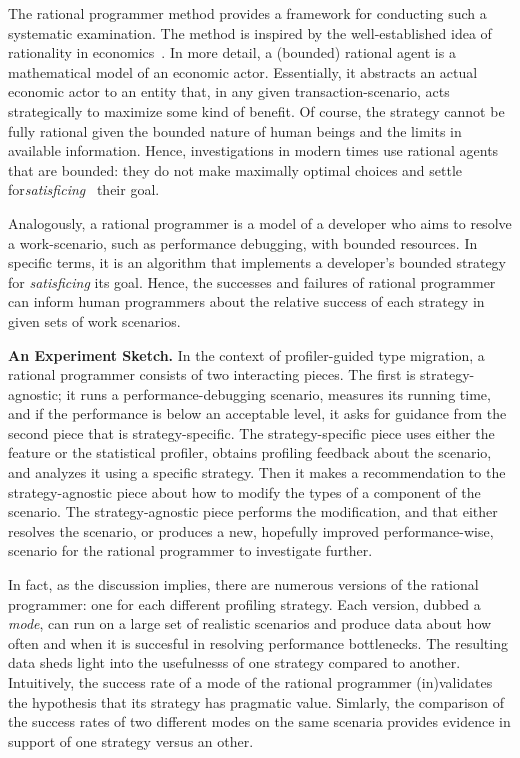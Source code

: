 The rational programmer method provides a framework for conducting such a
systematic examination. The method is inspired by the well-established idea of
rationality in economics~\cite{mill1874essays, henrich2001search}.  In more
detail, a (bounded) rational agent is a mathematical model of an economic
actor. Essentially, it abstracts an actual economic actor to an entity that, in
any given transaction-scenario, acts strategically to maximize some kind of
benefit.  Of course, the strategy cannot be fully rational given the bounded
nature of human beings and the limits in available information. Hence,
investigations in modern times use rational agents that are bounded: they do not
make maximally optimal choices and settle
for\emph{satisficing}~\cite{hs:satisfice} their goal.

Analogously, a rational programmer is a model of a developer who aims to resolve
a work-scenario, such as performance debugging, with bounded resources. In
specific terms, it is an algorithm that implements a developer's bounded
strategy for \emph{satisficing} its goal.  Hence, the successes and failures of
rational programmer can inform human programmers about the relative success of
each strategy in given sets of work scenarios.




\bigskip

\noindent\textbf{An Experiment Sketch.} In the context of profiler-guided
type migration, a rational programmer consists of two interacting pieces.
The first is strategy-agnostic; it runs a performance-debugging scenario,
measures its running time, and if the performance is below an acceptable
level, it asks for guidance from the second piece that is
strategy-specific. The strategy-specific piece uses either the feature or
the statistical profiler, obtains profiling feedback about the scenario,
and analyzes it using a specific strategy. Then it makes a recommendation
to the strategy-agnostic piece about how to modify the types of a
component of the scenario. The strategy-agnostic piece performs the
modification, and that either resolves the scenario, or produces a new,
hopefully improved performance-wise, scenario for the rational programmer
to investigate further. 

In fact, as the discussion implies, 
there are numerous versions of  the rational programmer: 
one for each different profiling strategy. Each version, dubbed a
\emph{mode}, can run on a large set of realistic scenarios and produce
data about how often and when it is succesful in resolving performance
bottlenecks. The resulting data sheds light into the usefulnesss
of one strategy compared to another. Intuitively, the success rate of a mode of the
rational programmer (in)validates the hypothesis that its
strategy has pragmatic value. Simlarly, the comparison of the  success
rates of two different modes on the same scenaria provides evidence in
support of one strategy versus an other.



